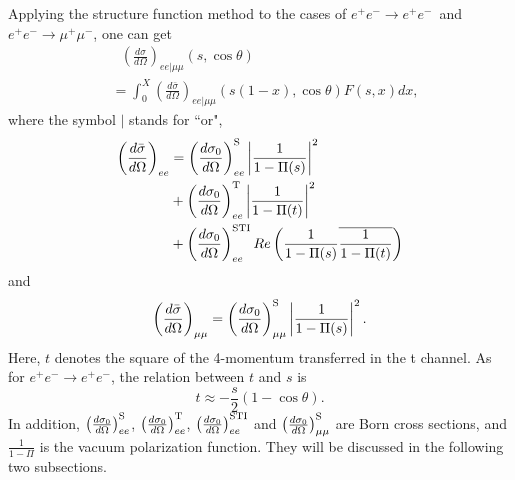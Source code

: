 \documentclass[a4paper,10pt,twoside]{cpc-hepnp}
\newcommand{\eetoee}{$e^+e^- \to e^+e^-$~}
\newcommand{\eetoeewos}{$e^+e^- \to e^+e^-$}
\newcommand{\eetomumuwos}{$e^+e^- \to \mu^+\mu^-$}
\newcommand{\csth}{\cos\theta}
\begin{document}
\begin{CJK*}{UTF8}{gbsn}
\begin{multicols}{2}
Applying the structure function method to the cases of \eetoee and \eetomumuwos, one can get
\begin{align}
	&\ \ \  \left(\frac{d\sigma}{d\Omega}\right)_{ee|\mu\mu}(s,\cos\theta) \nonumber \\
	& = \int_0^X \left(\frac{d\bar{\sigma}}{d\Omega}\right)_{ee|\mu\mu}(s(1-x),\cos\theta) F(s,x) dx,
	\label{Equation: Formula of structure function method applied to eetoee and eetomumu.}
\end{align}
where the symbol $|$ stands for ``or",
\begin{align}
	\left(\frac{d\bar{\sigma}}{d\Omega}\right)_{ee} & = \left(\frac{d\sigma_0}{d\Omega}\right)_{ee}^{\rm S}\left|\frac{1}{1-\Pi(s)}\right|^2 \nonumber \\
	& + \left(\frac{d\sigma_0}{d\Omega}\right)_{ee}^{\rm T}\left|\frac{1}{1-\Pi(t)}\right|^2 \nonumber \\
	& + \left(\frac{d\sigma_0}{d\Omega}\right)_{ee}^{\rm STI} Re\left(\frac{1}{1-\Pi(s)}\overline{\frac{1}{1-\Pi(t)}}\right) \label{Equation: Cross sections of eetoee with vacuum polarization considered}
\end{align}
and
\begin{equation}
	\left(\frac{d\bar{\sigma}}{d\Omega}\right)_{\mu\mu} = \left(\frac{d\sigma_0}{d\Omega}\right)_{\mu\mu}^{\rm S}\left|\frac{1}{1-\Pi(s)}\right|^2. \label{Equation: Cross sections of eetomumu with vacuum polarization considered}
\end{equation}
Here, $t$ denotes the square of the 4-momentum transferred in the t channel. As for \eetoeewos, the relation between $t$ and $s$ is
\begin{equation}
	t \approx -\frac{s}{2}(1-\csth).
\end{equation}
In addition, $\left(\frac{d\sigma_0}{d\Omega}\right)_{ee}^{\rm S}$, $\left(\frac{d\sigma_0}{d\Omega}\right)_{ee}^{\rm T}$, $\left(\frac{d\sigma_0}{d\Omega}\right)_{ee}^{\rm STI}$ and $\left(\frac{d\sigma_0}{d\Omega}\right)_{\mu\mu}^{\rm S}$ are Born cross sections, and $\frac{1}{1-\Pi}$ is the vacuum polarization function. They will be discussed in the following two subsections.


\end{multicols}
\end{CJK*}
\end{document}
